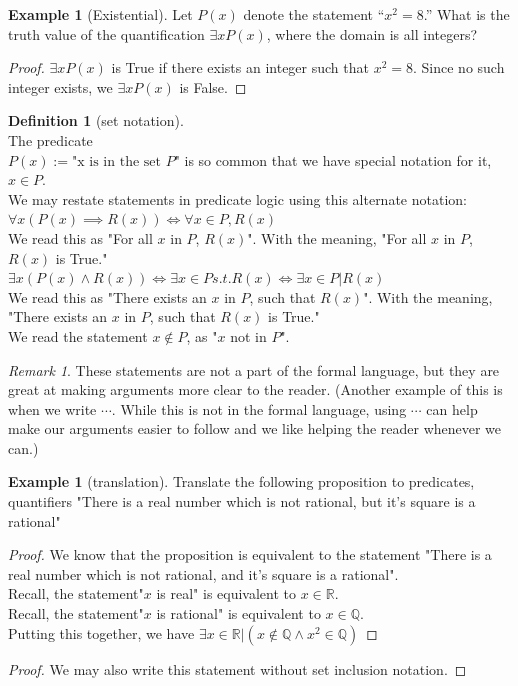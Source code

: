 \documentclass[letterpaper,10pt]{article}
\theoremstyle{plain}
\theoremstyle{definition}
\newtheorem{defn}[thm]{Definition}
\newtheorem{exmp}[thm]{Example}
\theoremstyle{remark}
\newtheorem{rem}[thm]{Remark}
\providecommand{\land}{\ensuremath{\wedge}}
\begin{document}
\begin{exmp}[Existential]
Let $P(x)$ denote the statement “$x^2 = 8 $.” What is the truth value of the quantification $\exists xP(x)$,
where the domain is all integers?
\begin{proof}
$\exists x P(x)$ is True if there exists an integer such that $x^2=8$. Since no such integer exists, we $\exists x P(x)$ is False.
\end{proof}
\end{exmp}
\begin{defn}[set notation] \ \\
The predicate
\\
$P(x):= \text{"x is in the set $P$"}$ is so common that we have special notation for it, $x \in P$.
\\
We may restate statements in predicate logic using this alternate notation:
\\
$\forall x (P(x) \implies R(x))\iff \forall x \in P, R(x)$
\\
We read this as "For all $x$ in $P$, $R(x)$". With the meaning, "For all $x$ in $P$, $R(x)$ is True."
\\
$\exists x (P(x) \land  R(x))\iff \exists x \in P s.t. R(x)\iff \exists x \in P | R(x)$
\\
We read this as "There exists an $x$ in $P$, such that $R(x)$". With the meaning, "There exists an $x$ in $P$, such that $R(x)$ is True."
\\
We read the statement $x\notin P$, as "$x$ not in $P$".
\end{defn}
\begin{rem}
These statements are not a part of the formal language, but they are great at making arguments  more clear to the reader. (Another example of this is when we write $\cdots$. While this is not in the formal language, using $\cdots$ can help make our arguments easier to follow and we like helping the reader whenever we can.)
\end{rem}
\begin{exmp}[translation]
Translate the following proposition to predicates, quantifiers
"There is a real number which is not rational, but it's square is a rational"

\begin{proof}
We know that the proposition is equivalent to the statement "There is a real number which is not rational, and it's square is a rational".
\\
Recall, the statement"$x$ is real" is equivalent to $x \in \mathbb{R}$.
\\
Recall, the statement"$x$ is rational" is equivalent to $x \in \mathbb{Q}$.
\\
Putting this together, we have
$\exists x \in \mathbb{R} |( x \notin \mathbb{Q} \land x^2 \in \mathbb{Q} )$
\end{proof}
\begin{proof}
We may also write this statement without set inclusion notation.



\end{proof}



\end{exmp}
\end{document}
